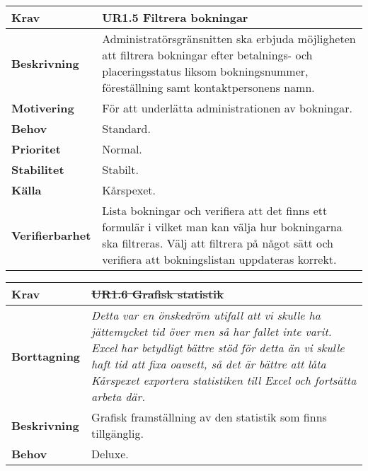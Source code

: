\documentclass[a4paper, twoside, 11pt, titlepage]{article}
\begin{document}
		\begin {table} [ht] \begin{tabular} { p{2.6cm} p{12.5cm} }
			\hline
			{\sffamily\textbf{Krav}} & {\sffamily\textbf{UR1.5 Filtrera bokningar }} \\
			\hline
			{\sffamily\textbf{Beskrivning}} & {Administratörsgränsnitten ska erbjuda möjligheten att filtrera bokningar efter betalnings- och placeringsstatus liksom bokningsnummer, föreställning samt kontaktpersonens namn.} \\
			\hline
			{\sffamily\textbf{Motivering}} & {För att underlätta administrationen av bokningar.} \\
			\hline
			{\sffamily\textbf{Behov}} & {Standard.} \\
			\hline
			{\sffamily\textbf{Prioritet}} & {Normal.} \\
			\hline
			{\sffamily\textbf{Stabilitet}} & {Stabilt.} \\
			\hline
			{\sffamily\textbf{Källa}} & {Kårspexet.} \\
			\hline
			{\sffamily\textbf{Verifierbarhet}} & {Lista bokningar och verifiera att det finns ett formulär i vilket man kan välja hur bokningarna ska filtreras. Välj att filtrera på något sätt och verifiera att bokningslistan uppdateras korrekt.} \\
			\hline
		\end{tabular} \end{table} \FloatBarrier
		\vspace{6mm}

		\begin {table} [ht] \begin{tabular} { p{2.6cm} p{12.5cm} }
			\hline
			{\sffamily\textbf{Krav}} & {\sffamily\textbf{\sout{UR1.6 Grafisk statistik}}} \\
			\hline
			{\sffamily\textbf{Borttagning}} & {\emph{Detta var en önskedröm utifall att vi skulle ha jättemycket tid över men så har fallet inte varit. Excel har betydligt bättre stöd för detta än vi skulle haft tid att fixa oavsett, så det är bättre att låta Kårspexet exportera statistiken till Excel och fortsätta arbeta där.}} \\
			\hline
			{\sffamily\textbf{Beskrivning}} & {Grafisk framställning av den statistik som finns tillgänglig.} \\
			\hline
			{\sffamily\textbf{Behov}} & {Deluxe.} \\
			\hline
		\end{tabular} \end{table} \FloatBarrier
		\vspace{6mm}
\end{document}

